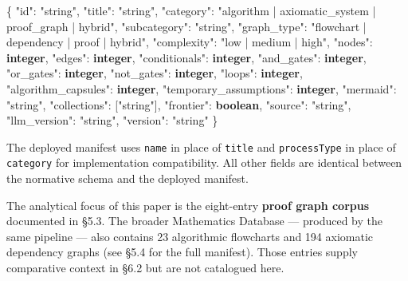 \documentclass[
  11pt]{article}
\newenvironment{Shaded}{}{}
\newcommand{\DataTypeTok}[1]{\textcolor[rgb]{0.56,0.13,0.00}{#1}}
\newcommand{\ErrorTok}[1]{\textcolor[rgb]{1.00,0.00,0.00}{\textbf{#1}}}
\newcommand{\FunctionTok}[1]{\textcolor[rgb]{0.02,0.16,0.49}{#1}}
\newcommand{\OtherTok}[1]{\textcolor[rgb]{0.00,0.44,0.13}{#1}}
\newcommand{\StringTok}[1]{\textcolor[rgb]{0.25,0.44,0.63}{#1}}
\begin{document}
\begin{Shaded}
\begin{Highlighting}[]
\FunctionTok{\{}
  \DataTypeTok{"id"}\FunctionTok{:} \StringTok{"string"}\FunctionTok{,}
  \DataTypeTok{"title"}\FunctionTok{:} \StringTok{"string"}\FunctionTok{,}
  \DataTypeTok{"category"}\FunctionTok{:} \StringTok{"algorithm | axiomatic\_system | proof\_graph | hybrid"}\FunctionTok{,}
  \DataTypeTok{"subcategory"}\FunctionTok{:} \StringTok{"string"}\FunctionTok{,}
  \DataTypeTok{"graph\_type"}\FunctionTok{:} \StringTok{"flowchart | dependency | proof | hybrid"}\FunctionTok{,}
  \DataTypeTok{"complexity"}\FunctionTok{:} \StringTok{"low | medium | high"}\FunctionTok{,}
  \DataTypeTok{"nodes"}\FunctionTok{:} \ErrorTok{integer}\FunctionTok{,}
  \DataTypeTok{"edges"}\FunctionTok{:} \ErrorTok{integer}\FunctionTok{,}
  \DataTypeTok{"conditionals"}\FunctionTok{:} \ErrorTok{integer}\FunctionTok{,}
  \DataTypeTok{"and\_gates"}\FunctionTok{:} \ErrorTok{integer}\FunctionTok{,}
  \DataTypeTok{"or\_gates"}\FunctionTok{:} \ErrorTok{integer}\FunctionTok{,}
  \DataTypeTok{"not\_gates"}\FunctionTok{:} \ErrorTok{integer}\FunctionTok{,}
  \DataTypeTok{"loops"}\FunctionTok{:} \ErrorTok{integer}\FunctionTok{,}
  \DataTypeTok{"algorithm\_capsules"}\FunctionTok{:} \ErrorTok{integer}\FunctionTok{,}
  \DataTypeTok{"temporary\_assumptions"}\FunctionTok{:} \ErrorTok{integer}\FunctionTok{,}
  \DataTypeTok{"mermaid"}\FunctionTok{:} \StringTok{"string"}\FunctionTok{,}
  \DataTypeTok{"collections"}\FunctionTok{:} \OtherTok{[}\StringTok{"string"}\OtherTok{]}\FunctionTok{,}
  \DataTypeTok{"frontier"}\FunctionTok{:} \ErrorTok{boolean}\FunctionTok{,}
  \DataTypeTok{"source"}\FunctionTok{:} \StringTok{"string"}\FunctionTok{,}
  \DataTypeTok{"llm\_version"}\FunctionTok{:} \StringTok{"string"}\FunctionTok{,}
  \DataTypeTok{"version"}\FunctionTok{:} \StringTok{"string"}
\FunctionTok{\}}
\end{Highlighting}
\end{Shaded}

The deployed manifest uses \texttt{name} in place of \texttt{title} and
\texttt{processType} in place of \texttt{category} for implementation
compatibility. All other fields are identical between the normative
schema and the deployed manifest.

The analytical focus of this paper is the eight-entry \textbf{proof
graph corpus} documented in §5.3. The broader Mathematics Database ---
produced by the same pipeline --- also contains 23 algorithmic
flowcharts and 194 axiomatic dependency graphs (see §5.4 for the full
manifest). Those entries supply comparative context in §6.2 but are not
catalogued here.
\end{document}
